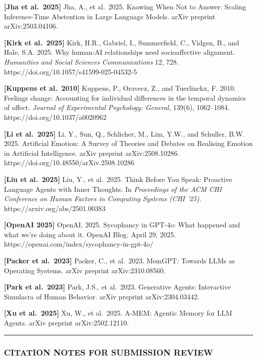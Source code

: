 \textbf{{[}Jha et al.~2025{]}} Jha, A., et al.~2025. Knowing When Not to
Answer: Scaling Inference-Time Abstention in Large Language Models.
arXiv preprint arXiv:2503.04106.

\textbf{{[}Kirk et al.~2025{]}} Kirk, H.R., Gabriel, I., Summerfield,
C., Vidgen, B., and Hale, S.A. 2025. Why human-AI relationships need
socioaffective alignment. \emph{Humanities and Social Sciences
Communications} 12, 728. https://doi.org/10.1057/s41599-025-04532-5

\textbf{{[}Kuppens et al.~2010{]}} Kuppens, P., Oravecz, Z., and
Tuerlinckx, F. 2010. Feelings change: Accounting for individual
differences in the temporal dynamics of affect. \emph{Journal of
Experimental Psychology: General}, 139(6), 1062--1084.
https://doi.org/10.1037/a0020962

\textbf{{[}Li et al.~2025{]}} Li, Y., Sun, Q., Schlicher, M., Lim, Y.W.,
and Schuller, B.W. 2025. Artificial Emotion: A Survey of Theories and
Debates on Realising Emotion in Artificial Intelligence. arXiv preprint
arXiv:2508.10286. https://doi.org/10.48550/arXiv.2508.10286

\textbf{{[}Liu et al.~2025{]}} Liu, Y., et al.~2025. Think Before You
Speak: Proactive Language Agents with Inner Thoughts. In
\emph{Proceedings of the ACM CHI Conference on Human Factors in
Computing Systems (CHI '25)}. https://arxiv.org/abs/2501.00383

\textbf{{[}OpenAI 2025{]}} OpenAI. 2025. Sycophancy in GPT-4o: What
happened and what we're doing about it. OpenAI Blog. April 29, 2025.
https://openai.com/index/sycophancy-in-gpt-4o/

\textbf{{[}Packer et al.~2023{]}} Packer, C., et al.~2023. MemGPT:
Towards LLMs as Operating Systems. arXiv preprint arXiv:2310.08560.

\textbf{{[}Park et al.~2023{]}} Park, J.S., et al.~2023. Generative
Agents: Interactive Simulacra of Human Behavior. arXiv preprint
arXiv:2304.03442.

\textbf{{[}Xu et al.~2025{]}} Xu, W., et al.~2025. A-MEM: Agentic Memory
for LLM Agents. arXiv preprint arXiv:2502.12110.

\begin{center}\rule{0.5\linewidth}{0.5pt}\end{center}

\subsubsection{CITATION NOTES FOR SUBMISSION
REVIEW}\label{citation-notes-for-submission-review}


